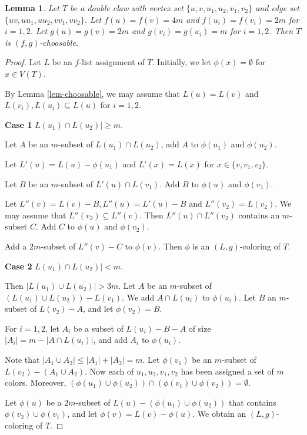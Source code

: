 \documentclass{article}
\newtheorem{lemma}{Lemma}
\begin{document}
\begin{lemma}
\label{lem-doubleclaw}
    Let $T$ be a double claw with vertex set $\{u,v, u_1,u_2, v_1,v_2\}$ 
    and edge set $\{uv,uu_1,uu_2, vv_1, vv_2\}$. 
    Let $f(u)=f(v)=4m$ and $f(u_i)=f(v_i)=2m$ for $i=1,2$. 
    Let $g(u)=g(v)=2m$ and $g(v_i) = g(u_i) =m$ for $i=1,2$. Then $T$ is $(f,g)$-choosable. 
\end{lemma}
\begin{proof}
Let $L$ be an $f$-list assignment of $T$. Initially, we let $\phi(x)= \emptyset$ for $x \in V(T)$. 

By Lemma \ref{lem-choosable}, we may assume that $L(u)=L(v)$ and   $L(v_i), L(u_i) \subseteq L(u) $ for $i=1,2$. 

\noindent
{\bf Case 1}  $L(u_1) \cap L(u_2)| \ge m$.

Let $A$ be an $m$-subset of $L(u_1) \cap L(u_2)$, add $A$ to $\phi(u_1)$ and $\phi(u_2)$. 
 
 Let $L'(u) = L(u) - \phi(u_1)$ and  $L'(x)=L(x)$ for $x \in \{v, v_1, v_2\}$. 
 
 Let $B$ be an $m$-subset of $L'(u) \cap L(v_1)$. Add $B$ to $\phi(u)$ and $\phi(v_1)$. 
 
 Let $L''(v)=L(v)-B, L''(u)=L'(u)-B$ and $L''(v_2)=L(v_2)$. We may assume that $L''(v_2) \subseteq L''(v)$. Then $L''(u) \cap L''(v_2)$ contains an $m$-subset $C$. Add $C$ to $\phi(u)$ and $\phi(v_2)$. 
 
 Add a $2m$-subset of $L''(v)-C$ to $\phi(v)$.  Then $\phi$ is an $(L,g)$-coloring of $T$. 

\noindent
{\bf Case 2}  $L(u_1) \cap L(u_2)| < m$.

 
 Then $|L(u_1) \cup L(u_2)| > 3m$. Let $A$ be an $m$-subset of $(L(u_1) \cup L(u_2)) - L(v_1) $. We add $A \cap L(u_i)$ to $\phi(u_i)$. Let $B$ an $m$-subset of $L(v_2) - A$, and let $\phi(v_2) = B$. 

For $i=1,2$, let  $A_i$ be a subset of $L(u_i)-B-A$ of size $|A_i|=m-|A \cap L(u_i)|$, and add $A_i$ to $\phi(u_i)$. 

Note that $|A_1 \cup A_2| \le |A_1|+|A_2| = m$. 
Let $\phi(v_1)$ be an $m$-subset  of $L(v_2) - (A_1 \cup A_2)$. 
Now each of $u_1,u_2, v_1, v_2$ has been assigned a set of $m$ colors. Moreover, $(\phi(u_1) \cup \phi(u_2)) \cap (\phi(v_1) \cup \phi(v_2)) = \emptyset $. 


Let $\phi(u)$ be a $2m$-subset of $L(u)-(\phi(u_1) \cup \phi(u_2))$ that contains $ \phi(v_2) \cup \phi(v_1)$, and let $\phi(v) =L(v) -\phi(u)$. We obtain an $(L,g)$-coloring of $T$. 
   \end{proof}
\end{document}
